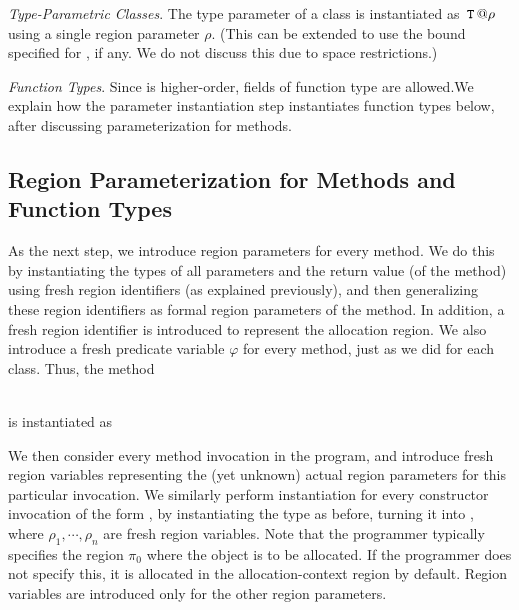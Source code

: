 \emph{Type-Parametric Classes}.
The type parameter  of a class  is instantiated as $\,{\tt T}\,@\rho$ using a single region parameter $\rho$. 
(This can be extended to use the bound specified for , if any. We do not
discuss this due to space restrictions.)

\emph{Function Types}.
Since \FB{} is higher-order, fields of function type are allowed.We explain how the parameter instantiation step
instantiates function types below, after discussing parameterization for methods.




\subsection{Region Parameterization for Methods and Function Types}

As the next step, we introduce region parameters for every method.
We do this by instantiating the types of all parameters and the
return value (of the method) using fresh region identifiers (as explained previously),
and then generalizing these region identifiers as formal region parameters
of the method. In addition, a fresh region identifier is introduced to represent the
allocation region.
We also introduce a fresh predicate variable $\varphi$ for every method,
just as we did for each class.
Thus, the method

 \\
is instantiated as


We then consider every method invocation in the program, and introduce
fresh region variables representing the (yet unknown) actual region
parameters for this particular invocation.
%
We similarly perform instantiation for every constructor invocation
of the form , by instantiating the type  as
before, turning it into ,
where $\rho_1, \cdots, \rho_n$ are fresh region variables. Note that the programmer
typically specifies the region $\pi_0$ where the object is to be allocated. If the programmer
does not specify this, it is allocated in the allocation-context region by default. Region
variables are introduced only for the other region parameters.

